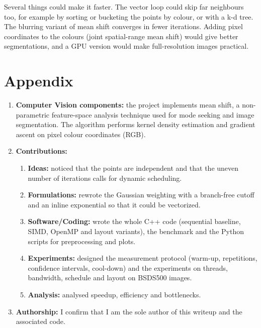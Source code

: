 \documentclass[10pt,twocolumn,letterpaper]{article}
\begin{document}
Several things could make it faster. The vector loop could skip far neighbours too, for example by
sorting or bucketing the points by colour, or with a k-d tree. The blurring variant of mean shift
converges in fewer iterations. Adding pixel coordinates to the colours (joint spatial-range mean
shift) would give better segmentations, and a GPU version would make
full-resolution images practical.

{\small


}

\section*{Appendix}
\begin{enumerate}
\item \textbf{Computer Vision components:} the project implements mean shift, a non-parametric
feature-space analysis technique used for mode seeking and image segmentation. The algorithm
performs kernel density estimation and gradient ascent on pixel colour coordinates (RGB).
\item \textbf{Contributions:}
	\begin{enumerate}
	\item \textbf{Ideas:} noticed that the points are independent and that the uneven number of
	iterations calls for dynamic scheduling.
	\item \textbf{Formulations:} rewrote the Gaussian weighting with a branch-free cutoff and an
	inline exponential so that it could be vectorized.
	\item \textbf{Software/Coding:} wrote the whole C++ code (sequential baseline, SIMD, OpenMP and
	layout variants), the benchmark and the Python scripts for preprocessing and plots.
	\item \textbf{Experiments:} designed the measurement protocol (warm-up, repetitions, confidence
	intervals, cool-down) and the experiments on threads, bandwidth, schedule and layout on
	BSDS500 images.
	\item \textbf{Analysis:} analysed speedup, efficiency and bottlenecks.
	\end{enumerate}
\item \textbf{Authorship:} I confirm that I am the sole author of this writeup and the associated code.
\end{enumerate}
\end{document}
